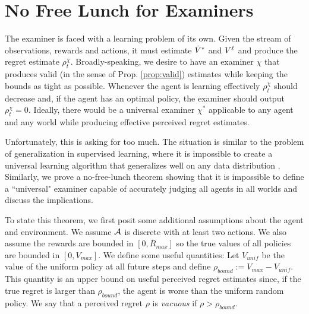 \section{No Free Lunch for Examiners}
\label{sec:nfl}


The examiner is faced with a learning problem of its own. 
Given the stream of observations, rewards and actions, it must estimate $\tilde{V}^*$ and $V^{\ell}$ and produce the regret estimate $\rho^\chi_t$. 
Broadly-speaking, we desire to have an examiner $\chi$ that produces valid (in the sense of Prop. \ref{prop:valid}) estimates while keeping the bounds as tight as possible. 
Whenever the agent is learning effectively $\rho^\chi_t$ should decrease and, if the agent has an optimal policy, the examiner should output $\rho^\chi_t=0$.
Ideally, there would be a universal examiner $\chi^*$ applicable to any agent and any world while producing effective perceived regret estimates. 

Unfortunately, this is asking for too much. The situation is similar to the problem of generalization in supervised learning, where it is impossible to create a universal learning algorithm that generalizes well on any data distribution \citep{wolpert1996lack}.
Similarly, we prove a no-free-lunch theorem showing that it is impossible to define a ``universal" examiner capable of accurately judging all agents in all worlds and discuss the implications. 

To state this theorem, we first posit some additional assumptions about the agent and environment. We assume $\mathcal{A}$ is discrete with at least two actions. We also assume the rewards are bounded in $[0, R_{max}]$ so the true values of all policies are bounded in $[0, V_{max}]$. We define some useful quantities:
Let $V_{unif}$ be the value of the uniform policy at all future steps and define $\rho_{bound} := V_{max} - V_{unif}$. This quantity is an upper bound on useful perceived regret estimates since, if the true regret is larger than $\rho_{bound}$, the agent is worse than the uniform random policy.
We say that a perceived regret $\rho$ is \textit{vacuous} if $\rho > \rho_{bound}$. 

